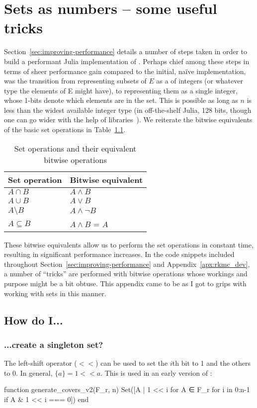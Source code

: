 \chapter{Sets as numbers -- some useful tricks}
Section~\ref{sec:improving-performance} details a number of steps taken in order to build a performant Julia implementation of . Perhaps chief among these steps in terms of sheer performance gain compared to the initial, naïve implementation, was the transition from representing subsets of $E$ as a  of integers (or whatever type the elements of E might have), to representing them as a single integer, whose 1-bits denote which elements are in the set. This is possible as long as $n$ is less than the widest available integer type (in off-the-shelf Julia, 128 bits, though one can go wider with the help of libraries~\cite{BitIntegers.jl}). We reiterate the bitwise equivalents of the basic set operations in Table~\ref{tab:equiv-bitwise}.
\begin{table}[!ht]
  \caption{Set operations and their equivalent bitwise operations}
  \label{tab:equiv-bitwise}
  \centering
  \begin{tabular}{|l|l|}
  \hline
      Set operation   & Bitwise equivalent   \\\hline
      $A \cap B$      & $A \land B$       \\\hline
      $A \cup B$      & $A \lor B$        \\\hline
      $A \setminus B$ & $A \land \lnot B$   \\\hline
      $A \subseteq B$ & $A \land B$ = $A$ \\\hline
  \end{tabular}
\end{table}
These bitwise equivalents allow us to perform the set operations in constant time, resulting in significant performance increases. In the code snippets included throughout Section~\ref{sec:improving-performance} and Appendix~\ref{apx:rkmc_dev}, a number of ``tricks'' are performed with bitwise operations whose workings and purpose might be a bit obtuse. This appendix came to be as I got to grips with working with sets in this manner.

\section*{How do I...}
\subsection*{...create a singleton set?}
The left-shift operator ($<<$) can be used to set the $i$th bit to 1 and the others to 0. In general, $\{a\} = 1<<a$. This is used in an early version of :
\begin{jllisting}
function generate_covers_v2(F_r, n)
  Set([A | 1 << i for A ∈ F_r for i in 0:n-1 if A & 1 << i === 0])
end
\end{jllisting}

